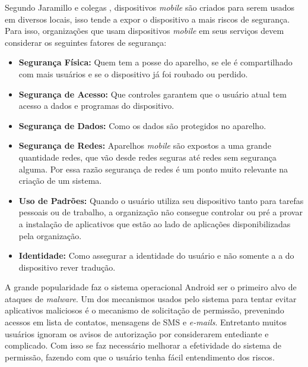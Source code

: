 Segundo Jaramillo e colegas \cite{jaramillo2013cross}, dispositivos \textit{mobile} são criados para serem usados em diversos locais, isso tende a expor o dispositivo a mais riscos de segurança.  Para isso, organizações que usam dispositivos \textit{mobile} em seus serviços devem considerar os seguintes fatores de segurança:
\begin{itemize}
    \item \textbf{Segurança Física:} Quem tem a posse do aparelho, se ele é compartilhado com mais usuários e se o dispositivo já foi roubado ou perdido.
    \item \textbf{Segurança de Acesso:} Que controles garantem que o usuário atual tem acesso a dados e programas do dispositivo.   
    \item \textbf{Segurança de Dados:} Como os dados são protegidos no aparelho. 
    \item \textbf{Segurança de Redes:} Aparelhos \textit{mobile} são expostos a uma grande quantidade redes, que vão desde redes seguras até redes sem segurança alguma. Por essa razão segurança de redes é um ponto muito relevante na criação de um sistema.
    \item \textbf{Uso de Padrões:} Quando o usuário utiliza seu dispositivo tanto para tarefas pessoais ou de trabalho, a organização não consegue controlar ou  pré a provar a instalação de aplicativos que estão ao lado de aplicações disponibilizadas pela organização. 
    \item \textbf{Identidade:} Como assegurar a identidade do usuário e não somente a a do dispositivo rever tradução.
\end{itemize}

A grande popularidade faz o sistema operacional Android ser o primeiro alvo de ataques de \textit{malware}. Um dos mecanismos usados pelo sistema para tentar evitar aplicativos maliciosos é o mecanismo de solicitação de permissão, prevenindo acessos em lista de contatos, mensagens de SMS e \textit{e-mails}. Entretanto muitos usuários ignoram os avisos de autorização por considerarem entediante e complicado. Com isso se faz necessário melhorar a efetividade do sistema de permissão, fazendo com que o usuário tenha fácil entendimento dos riscos. \cite{wang2017android}


